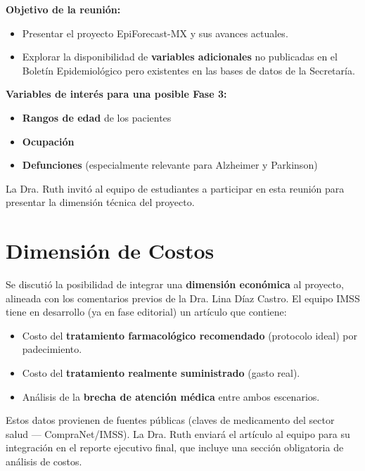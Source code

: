 \documentclass[11pt, a4paper]{article}
\begin{document}
\textbf{Objetivo de la reunión:}
\begin{itemize}[leftmargin=1.5cm]
    \item Presentar el proyecto EpiForecast-MX y sus avances actuales.
    \item Explorar la disponibilidad de \textbf{variables adicionales} no publicadas en el Boletín Epidemiológico pero existentes en las bases de datos de la Secretaría.
\end{itemize}

\textbf{Variables de interés para una posible Fase 3:}
\begin{itemize}[leftmargin=1.5cm]
    \item \textbf{Rangos de edad} de los pacientes
    \item \textbf{Ocupación}
    \item \textbf{Defunciones} (especialmente relevante para Alzheimer y Parkinson)
\end{itemize}

La Dra. Ruth invitó al equipo de estudiantes a participar en esta reunión para presentar la dimensión técnica del proyecto.

\vspace{0.5cm}

\section{Dimensión de Costos}

Se discutió la posibilidad de integrar una \textbf{dimensión económica} al proyecto, alineada con los comentarios previos de la Dra. Lina Díaz Castro. El equipo IMSS tiene en desarrollo (ya en fase editorial) un artículo que contiene:

\begin{itemize}[leftmargin=1.5cm]
    \item Costo del \textbf{tratamiento farmacológico recomendado} (protocolo ideal) por padecimiento.
    \item Costo del \textbf{tratamiento realmente suministrado} (gasto real).
    \item Análisis de la \textbf{brecha de atención médica} entre ambos escenarios.
\end{itemize}

Estos datos provienen de fuentes públicas (claves de medicamento del sector salud --- CompraNet/IMSS). La Dra. Ruth enviará el artículo al equipo para su integración en el reporte ejecutivo final, que incluye una sección obligatoria de análisis de costos.
\end{document}
